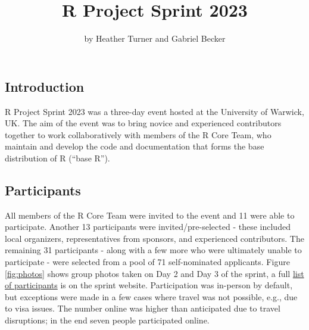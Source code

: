 \title{R Project Sprint 2023}
\author{by Heather Turner and Gabriel Becker}

\maketitle


\hypertarget{introduction}{%
\subsection{Introduction}\label{introduction}}

R Project Sprint 2023 was a three-day event hosted at the University of Warwick,
UK. The aim of the event was to bring novice and experienced contributors
together to work collaboratively with members of the R Core Team, who
maintain and develop the code and documentation that forms the base
distribution of R (``base R'').

\hypertarget{participants}{%
\subsection{Participants}\label{participants}}

All members of the R Core Team were invited to the event and 11 were
able to participate. Another 13 participants were invited/pre-selected - these
included local organizers, representatives from sponsors, and experienced
contributors. The remaining 31 participants - along with a few more who were
ultimately unable to participate - were selected from a pool of 71
self-nominated applicants. Figure \ref{fig:photos} shows group photos taken
on Day 2 and Day 3 of the sprint, a full \href{https://contributor.r-project.org/r-project-sprint-2023/participants/}{list of participants} is on the sprint website. Participation was in-person by default,
but exceptions were made in a few cases where travel was not possible, e.g.,
due to visa issues. The number online was higher than anticipated due to
travel disruptions; in the end seven people participated online.

